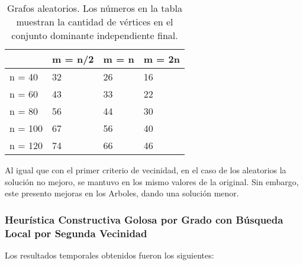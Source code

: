 \begin{table}[H]
\centering
\label{my-label}
\begin{tabular}{|l|lll|}
\hline
        & \multicolumn{1}{l|}{m = n/2} & \multicolumn{1}{l|}{m = n} & m = 2n \\ \hline
n = 40  & 32                           & 26                         & 16     \\ \cline{1-1}
n = 60  & 43                           & 33                         & 22     \\ \cline{1-1}
n = 80  & 56                           & 44                         & 30     \\ \cline{1-1}
n = 100 & 67                           & 56                         & 40     \\ \cline{1-1}
n = 120 & 74                           & 66                         & 46     \\ \hline
\end{tabular}
\caption{Grafos aleatorios. Los números en la tabla muestran la cantidad de vértices en el conjunto dominante independiente final.}
\end{table}

Al igual que con el primer criterio de vecinidad, en el caso de los aleatorios la solución no mejoro, se mantuvo en los mismo valores de la original. Sin embargo, este presento mejoras en los Arboles, dando una solución menor.

\subsubsection{Heurística Constructiva Golosa por Grado con Búsqueda Local por Segunda Vecinidad}

Los resultados temporales obtenidos fueron los siguientes:

